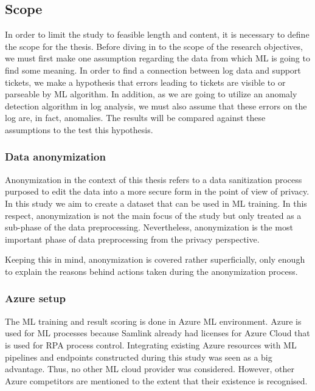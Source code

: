 \subsection{Scope}\label{subsec:intro-scope}

In order to limit the study
to feasible length and content,
it is necessary to define the scope for the thesis.
Before diving in to the scope of the research objectives,
we must first make one assumption regarding the data
from which ML is going to find some meaning.
In order to find a connection between log data and support tickets,
we make a hypothesis that errors leading to tickets
are visible to or parseable by ML algorithm.
In addition,
as we are going to utilize an anomaly detection algorithm in log analysis,
we must also assume that these errors on the log
are, in fact, anomalies.
The results will be compared against these assumptions
to the test this hypothesis.


\subsubsection*{Data anonymization}
Anonymization in the context of this thesis
refers to a data sanitization process
purposed to edit the data into
a more secure form in the point of view of privacy.
In this study
we aim to create a dataset that can be used in ML training.
In this respect,
anonymization is not the main focus of the study
but only treated as a sub-phase
of the data preprocessing.
Nevertheless,
anonymization is the most important phase of data preprocessing
from the privacy perspective.

Keeping this in mind,
anonymization is covered rather superficially,
only enough to explain the reasons
behind actions taken during the anonymization process.


\subsubsection*{Azure setup}
The ML training and result scoring
is done in Azure ML environment.
Azure is used for ML processes
because Samlink already had licenses for Azure Cloud
that is used for RPA process control.
Integrating existing Azure resources
with ML pipelines and endpoints constructed during this study
was seen as a big advantage.
Thus,
no other ML cloud provider was considered.
However,
other Azure competitors are mentioned to the extent
that their existence is recognised.

